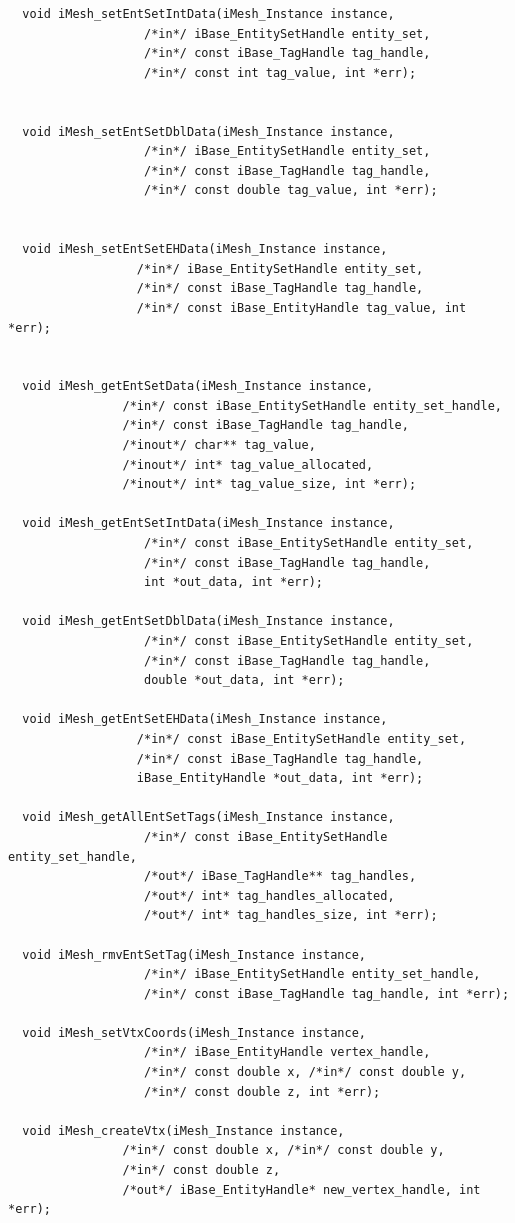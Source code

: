 \documentclass{article}
\begin{document}
\begin{small}
\begin{verbatim}
  void iMesh_setEntSetIntData(iMesh_Instance instance,
				   /*in*/ iBase_EntitySetHandle entity_set,
				   /*in*/ const iBase_TagHandle tag_handle,
				   /*in*/ const int tag_value, int *err);


  void iMesh_setEntSetDblData(iMesh_Instance instance,
				   /*in*/ iBase_EntitySetHandle entity_set,
				   /*in*/ const iBase_TagHandle tag_handle,
				   /*in*/ const double tag_value, int *err);


  void iMesh_setEntSetEHData(iMesh_Instance instance,
				  /*in*/ iBase_EntitySetHandle entity_set,
				  /*in*/ const iBase_TagHandle tag_handle,
				  /*in*/ const iBase_EntityHandle tag_value, int *err);


  void iMesh_getEntSetData(iMesh_Instance instance,
				/*in*/ const iBase_EntitySetHandle entity_set_handle,
				/*in*/ const iBase_TagHandle tag_handle,
				/*inout*/ char** tag_value,
				/*inout*/ int* tag_value_allocated,
				/*inout*/ int* tag_value_size, int *err);

  void iMesh_getEntSetIntData(iMesh_Instance instance,
				   /*in*/ const iBase_EntitySetHandle entity_set,
				   /*in*/ const iBase_TagHandle tag_handle,
				   int *out_data, int *err);

  void iMesh_getEntSetDblData(iMesh_Instance instance,
				   /*in*/ const iBase_EntitySetHandle entity_set,
				   /*in*/ const iBase_TagHandle tag_handle,
				   double *out_data, int *err);

  void iMesh_getEntSetEHData(iMesh_Instance instance,
				  /*in*/ const iBase_EntitySetHandle entity_set,
				  /*in*/ const iBase_TagHandle tag_handle,
				  iBase_EntityHandle *out_data, int *err);

  void iMesh_getAllEntSetTags(iMesh_Instance instance,
				   /*in*/ const iBase_EntitySetHandle entity_set_handle,
				   /*out*/ iBase_TagHandle** tag_handles,
				   /*out*/ int* tag_handles_allocated,
				   /*out*/ int* tag_handles_size, int *err);

  void iMesh_rmvEntSetTag(iMesh_Instance instance,
			       /*in*/ iBase_EntitySetHandle entity_set_handle,
			       /*in*/ const iBase_TagHandle tag_handle, int *err);

  void iMesh_setVtxCoords(iMesh_Instance instance,
			       /*in*/ iBase_EntityHandle vertex_handle,
			       /*in*/ const double x, /*in*/ const double y,
			       /*in*/ const double z, int *err);

  void iMesh_createVtx(iMesh_Instance instance,
			    /*in*/ const double x, /*in*/ const double y,
			    /*in*/ const double z,
			    /*out*/ iBase_EntityHandle* new_vertex_handle, int *err);


\end{verbatim}
\end{small}
\end{document}

